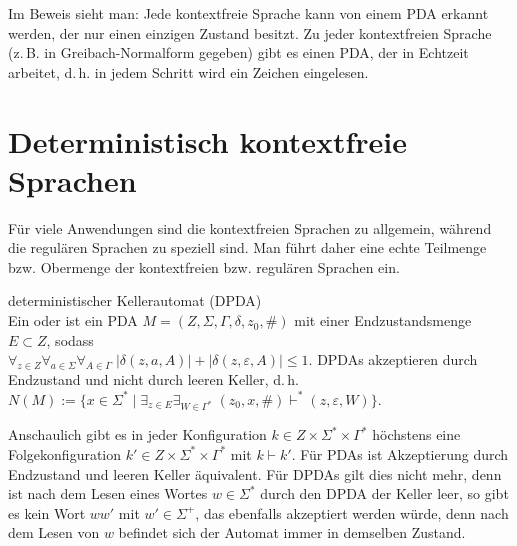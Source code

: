 \begin{Bem}
    Im Beweis sieht man:
    Jede kontextfreie Sprache kann von einem PDA erkannt werden, der nur
    einen einzigen Zustand besitzt.
    Zu jeder kontextfreien Sprache
    (z.\,B. in Greibach-Normalform gegeben)
    gibt es einen PDA, der in Echtzeit arbeitet, d.\,h. in jedem Schritt wird
    ein Zeichen eingelesen.
\end{Bem}

\pagebreak

\section{%
    Deterministisch kontextfreie Sprachen%
}

\begin{Bem}
    Für viele Anwendungen sind die kontextfreien Sprachen zu allgemein,
    während die regulären Sprachen zu speziell sind.
    Man führt daher eine echte Teilmenge bzw. Obermenge der kontextfreien bzw.
    regulären Sprachen ein.
\end{Bem}

\begin{Def}{deterministischer Kellerautomat (DPDA)}\\
    Ein  oder
     ist ein
    PDA $M = (Z, \Sigma, \Gamma, \delta, z_0, \#)$ mit einer
    Endzustandsmenge $E \subset Z$, sodass\\
    $\forall_{z \in Z} \forall_{a \in \Sigma} \forall_{A \in \Gamma}\;
    |\delta(z, a, A)| + |\delta(z, \varepsilon, A)| \le 1$.
    DPDAs akzeptieren durch Endzustand und nicht durch leeren Keller, d.\,h.
    $N(M) := \{x \in \Sigma^\ast \;|\;
    \exists_{z \in E} \exists_{W \in \Gamma^\ast}\;
    (z_0, x, \#) \vdash^\ast (z, \varepsilon, W)\}$.
\end{Def}

\begin{Bsp}
    Anschaulich gibt es in jeder Konfiguration
    $k \in Z \times \Sigma^\ast \times \Gamma^\ast$ höchstens eine
    Folgekonfiguration $k' \in Z \times \Sigma^\ast \times \Gamma^\ast$ mit
    $k \vdash k'$.
    Für PDAs ist Akzeptierung durch Endzustand und leeren Keller äquivalent.
    Für DPDAs gilt dies nicht mehr, denn ist nach dem Lesen eines Wortes
    $w \in \Sigma^\ast$ durch den DPDA der Keller leer, so gibt es kein
    Wort $ww'$ mit $w' \in \Sigma^+$, das ebenfalls akzeptiert werden würde,
    denn nach dem Lesen von $w$ befindet sich der Automat immer in demselben
    Zustand.
\end{Bsp}

